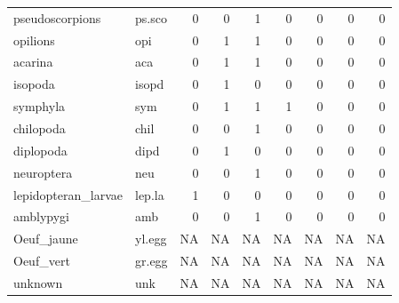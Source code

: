 \documentclass[fleqn,10pt]{ArtEcoFoG} %
\begin{document}
\begin{longtable}[t]{llrrrrrrr}
\addlinespace
pseudoscorpions & ps.sco & 0 & 0 & 1 & 0 & 0 & 0 & 0\\
opilions & opi & 0 & 1 & 1 & 0 & 0 & 0 & 0\\
acarina & aca & 0 & 1 & 1 & 0 & 0 & 0 & 0\\
isopoda & isopd & 0 & 1 & 0 & 0 & 0 & 0 & 0\\
symphyla & sym & 0 & 1 & 1 & 1 & 0 & 0 & 0\\
\addlinespace
chilopoda & chil & 0 & 0 & 1 & 0 & 0 & 0 & 0\\
diplopoda & dipd & 0 & 1 & 0 & 0 & 0 & 0 & 0\\
neuroptera & neu & 0 & 0 & 1 & 0 & 0 & 0 & 0\\
lepidopteran\_larvae & lep.la & 1 & 0 & 0 & 0 & 0 & 0 & 0\\
amblypygi & amb & 0 & 0 & 1 & 0 & 0 & 0 & 0\\
\addlinespace
Oeuf\_jaune & yl.egg & NA & NA & NA & NA & NA & NA & NA\\
Oeuf\_vert & gr.egg & NA & NA & NA & NA & NA & NA & NA\\
unknown & unk & NA & NA & NA & NA & NA & NA & NA\\
\bottomrule
\end{longtable}

\normalsize



\makeatletter

\makeatother


\end{document}
